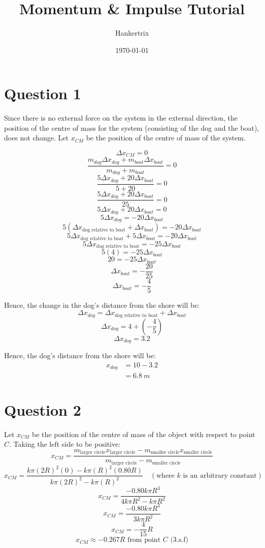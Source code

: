 \documentclass[11pt]{article}
\author{Hankertrix}
\date{\today}
\title{Momentum \& Impulse Tutorial}
\begin{document}
\maketitle
\setcounter{tocdepth}{2}
\tableofcontents

\newpage

\section{Question 1}
\label{sec:org104f724}

Since there is no external force on the system in the external direction, the position of the centre of mass for the system (consisting of the dog and the boat), does not change. Let \(x_{CM}\) be the position of the centre of mass of the system.

\[\Delta x_{CM} = 0\]
\[\frac{m_{dog}  \Delta x_{dog} + m_{boat} \Delta x_{boat}}{m_{dog} + m_{boat}} = 0\]
\[\frac{5 \Delta x_{dog} + 20 \Delta x_{boat}}{5 + 20} = 0\]
\[\frac{5 \Delta x_{dog} + 20 \Delta x_{boat}}{25} = 0\]
\[5 \Delta x_{dog} + 20 \Delta x_{boat} = 0\]
\[5 \Delta x_{dog} = - 20 \Delta x_{boat}\]
\[5 (\Delta x_{\text{dog relative to boat}} + \Delta x_{boat}) = - 20 \Delta x_{boat}\]
\[5 \Delta x_{\text{dog relative to boat}} + 5 \Delta x_{boat} = - 20 \Delta x_{boat}\]
\[5 \Delta x_{\text{dog relative to boat}} = - 25 \Delta x_{boat}\]
\[5 (4) = - 25 \Delta x_{boat}\]
\[20 = - 25 \Delta x_{boat}\]
\[\Delta x_{boat} = -\frac{20}{25}\]
\[\Delta x_{boat} = -\frac{4}{5}\]

Hence, the change in the dog's distance from the shore will be:
\[\Delta x_{dog} = \Delta x_{\text{dog relative to boat}} + \Delta x_{boat}\]
\[\Delta x_{dog} = 4 + \left(- \frac{4}{5} \right)\]
\[\Delta x_{dog} = 3.2\]

Hence, the dog's distance from the shore will be:
\begin{align*}
x_{dog} &= 10 - 3.2 \\
&= \qty{6.8}{\unit{m}}
\end{align*}

\section{Question 2}
\label{sec:org1aee5e4}

Let \(x_{CM}\) be the position of the centre of mass of the object with respect to point \(C\). Taking the left side to be positive:
\[x_{CM} = \frac{m_{\text{larger circle}} x_{\text{larger circle}} - m_{\text{smaller circle}} x_{\text{smaller circle}}}{m_{\text{larger circle}} - m_{\text{smaller circle}}}\]
\[x_{CM} = \frac{k\pi(2R)^2 (0) - k\pi(R)^2 (0.80R)}{k\pi(2R)^2 - k\pi(R)^2} \quad (\text{where } k \text{ is an arbitrary constant})\]
\[x_{CM} = \frac{- 0.80k\pi R^3}{4k\pi R^2 - k\pi R^2}\]
\[x_{CM} = \frac{- 0.80k\pi R^3}{3k\pi R^2}\]
\[x_{CM} = -\frac{4}{15} R\]
\[x_{CM} \approx - 0.267 R \text{ from point } C \text{ (3.s.f)}\]
\end{document}
